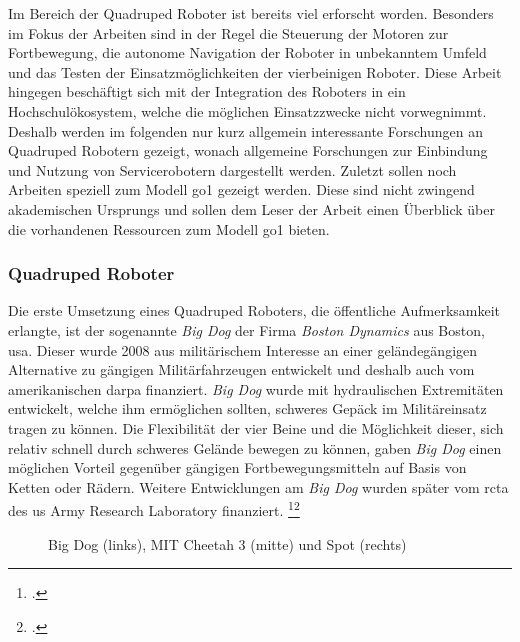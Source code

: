 Im Bereich der Quadruped Roboter ist bereits viel erforscht worden.
Besonders im Fokus der Arbeiten sind in der Regel die Steuerung der Motoren zur Fortbewegung, die autonome Navigation
der Roboter in unbekanntem Umfeld und das Testen der Einsatzmöglichkeiten der vierbeinigen Roboter.
Diese Arbeit hingegen beschäftigt sich mit der Integration des Roboters in ein Hochschulökosystem, welche die möglichen Einsatzzwecke
nicht vorwegnimmt.
Deshalb werden im folgenden nur kurz allgemein interessante Forschungen an Quadruped Robotern gezeigt, wonach
allgemeine Forschungen zur Einbindung und Nutzung von Servicerobotern dargestellt werden.
Zuletzt sollen noch Arbeiten speziell zum Modell \gls{go1} gezeigt werden.
Diese sind nicht zwingend akademischen Ursprungs und sollen dem Leser der Arbeit einen Überblick über die vorhandenen
Ressourcen zum Modell \gls{go1} bieten.

\subsubsection{Quadruped Roboter}
\label{subsubsec:quadruped-roboter}
Die erste Umsetzung eines Quadruped Roboters, die öffentliche Aufmerksamkeit erlangte, ist der sogenannte \emph{Big Dog}
der Firma \emph{Boston Dynamics} aus Boston, \gls{usa}.
Dieser wurde \num{2008} aus militärischem Interesse an einer geländegängigen Alternative zu gängigen Militärfahrzeugen entwickelt und
deshalb auch vom amerikanischen \gls{darpa} finanziert. \emph{Big Dog} wurde mit hydraulischen Extremitäten entwickelt, welche ihm ermöglichen sollten,
schweres Gepäck im Militäreinsatz tragen zu können.
Die Flexibilität der vier Beine und die Möglichkeit dieser, sich relativ schnell durch schweres Gelände bewegen zu können,
gaben \emph{Big Dog} einen möglichen Vorteil gegenüber gängigen Fortbewegungsmitteln auf Basis von Ketten oder Rädern.
Weitere Entwicklungen am \emph{Big Dog} wurden später vom \gls{rcta} des \gls{us} Army Research Laboratory finanziert.
\footcite{bigdog}\footcite{darpa_bigdog}

\begin{figure}[h]
    \caption[Big Dog (links), MIT Cheetah 3 (mitte) und Spot (rechts)]{Big Dog (links), MIT Cheetah 3 (mitte) und Spot (rechts)\footnotemark}\label{fig:doggos}
\end{figure}

